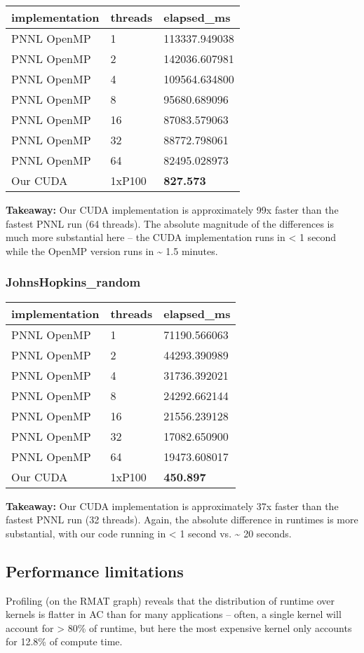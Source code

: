 \documentclass[10pt,oneside]{memoir}
\begin{document}
\begin{longtable}[]{@{}lll@{}}
\toprule
implementation & threads & elapsed\_ms\tabularnewline
\midrule
\endhead
PNNL OpenMP & 1 & 113337.949038\tabularnewline
PNNL OpenMP & 2 & 142036.607981\tabularnewline
PNNL OpenMP & 4 & 109564.634800\tabularnewline
PNNL OpenMP & 8 & 95680.689096\tabularnewline
PNNL OpenMP & 16 & 87083.579063\tabularnewline
PNNL OpenMP & 32 & 88772.798061\tabularnewline
PNNL OpenMP & 64 & 82495.028973\tabularnewline
Our CUDA & 1xP100 & \textbf{827.573}\tabularnewline
\bottomrule
\end{longtable}

\textbf{Takeaway:} Our CUDA implementation is approximately 99x faster
than the fastest PNNL run (64 threads). The absolute magnitude of the
differences is much more substantial here -- the CUDA implementation
runs in \textless{} 1 second while the OpenMP version runs in
\textasciitilde{} 1.5 minutes.

\hypertarget{johnshopkins_random-1}{%
\subsubsection{JohnsHopkins\_random}\label{johnshopkins_random-1}}

\begin{longtable}[]{@{}lll@{}}
\toprule
implementation & threads & elapsed\_ms\tabularnewline
\midrule
\endhead
PNNL OpenMP & 1 & 71190.566063\tabularnewline
PNNL OpenMP & 2 & 44293.390989\tabularnewline
PNNL OpenMP & 4 & 31736.392021\tabularnewline
PNNL OpenMP & 8 & 24292.662144\tabularnewline
PNNL OpenMP & 16 & 21556.239128\tabularnewline
PNNL OpenMP & 32 & 17082.650900\tabularnewline
PNNL OpenMP & 64 & 19473.608017\tabularnewline
Our CUDA & 1xP100 & \textbf{450.897}\tabularnewline
\bottomrule
\end{longtable}

\textbf{Takeaway:} Our CUDA implementation is approximately 37x faster
than the fastest PNNL run (32 threads). Again, the absolute difference
in runtimes is more substantial, with our code running in \textless{} 1
second vs. \textasciitilde{} 20 seconds.

\hypertarget{performance-limitations}{%
\subsection{Performance limitations}\label{performance-limitations}}

Profiling (on the RMAT graph) reveals that the distribution of runtime
over kernels is flatter in AC than for many applications -- often, a
single kernel will account for \textgreater{} 80\% of runtime, but here
the most expensive kernel only accounts for 12.8\% of compute time.
\end{document}
